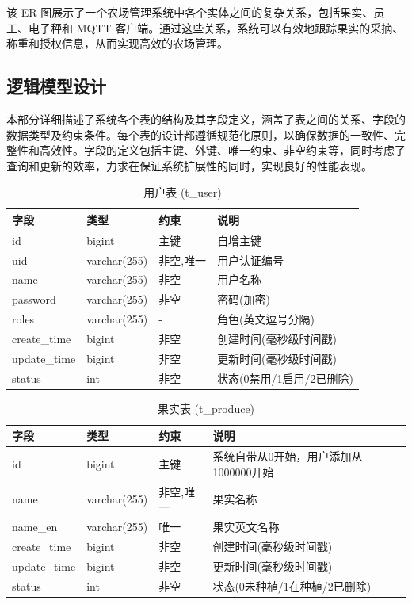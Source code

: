 该 ER 图展示了一个农场管理系统中各个实体之间的复杂关系，包括果实、员工、电子秤和 MQTT 客户端。通过这些关系，系统可以有效地跟踪果实的采摘、称重和授权信息，从而实现高效的农场管理。

\subsection{逻辑模型设计}

本部分详细描述了系统各个表的结构及其字段定义，涵盖了表之间的关系、字段的数据类型及约束条件。每个表的设计都遵循规范化原则，以确保数据的一致性、完整性和高效性。字段的定义包括主键、外键、唯一约束、非空约束等，同时考虑了查询和更新的效率，力求在保证系统扩展性的同时，实现良好的性能表现。

\begin{table}[H]
    \centering
    \caption{用户表 (t\_user)}
    \begin{tabular}{|l|l|l|l|}
    \hline
    字段 & 类型 & 约束 & 说明 \\
    \hline
    id & bigint & 主键 & 自增主键 \\
    uid & varchar(255) & 非空,唯一 & 用户认证编号 \\
    name & varchar(255) & 非空 & 用户名称 \\
    password & varchar(255) & 非空 & 密码(加密) \\
    roles & varchar(255) & - & 角色(英文逗号分隔) \\
    create\_time & bigint & 非空 & 创建时间(毫秒级时间戳) \\
    update\_time & bigint & 非空 & 更新时间(毫秒级时间戳) \\
    status & int & 非空 & 状态(0禁用/1启用/2已删除) \\
    \hline
    \end{tabular}
    \end{table}

\begin{table}[H]
\centering
\caption{果实表 (t\_produce)}
\begin{tabular}{|l|l|l|l|}
\hline
字段 & 类型 & 约束 & 说明 \\
\hline
id & bigint & 主键 & 系统自带从0开始，用户添加从1000000开始 \\
name & varchar(255) & 非空,唯一 & 果实名称 \\
name\_en & varchar(255) & 唯一 & 果实英文名称 \\
create\_time & bigint & 非空 & 创建时间(毫秒级时间戳) \\
update\_time & bigint & 非空 & 更新时间(毫秒级时间戳) \\
status & int & 非空 & 状态(0未种植/1在种植/2已删除) \\
\hline
\end{tabular}
\end{table}

